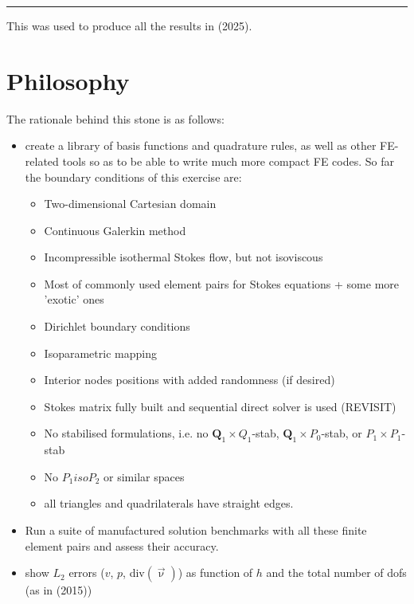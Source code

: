 \par\noindent\rule{\textwidth}{0.4pt}



This \stone was used to produce all the results in \textcite{thba25} (2025).

\section*{Philosophy}

The rationale behind this stone is as follows:
\begin{itemize}
\item create a library of basis functions and quadrature rules, as well as 
other FE-related tools so as to be able to write much more compact FE codes. 
So far the boundary conditions of this exercise are:
\begin{itemize}
\item Two-dimensional Cartesian domain
\item Continuous Galerkin method
\item Incompressible isothermal Stokes flow, but not isoviscous
\item Most of commonly used element pairs for Stokes equations + some more 'exotic' ones 
\item Dirichlet boundary conditions 
\item Isoparametric mapping 
\item Interior nodes positions with added randomness (if desired)
\item Stokes matrix fully built and sequential direct solver is used (REVISIT)
\item No stabilised formulations, i.e. no ${\bm Q}_1\times Q_1$-stab, 
      ${\bm Q}_1\times P_0$-stab, or $P_1\times P_1$-stab
\item No $P_1isoP_2$ or similar spaces
\item all triangles and quadrilaterals have straight edges.
\end{itemize}
\item Run a suite of manufactured solution benchmarks with all 
these finite element pairs and assess their accuracy.
\item show $L_2$ errors ($v$, $p$, div$(\vec\upnu)$) as function of $h$ and the 
total number of dofs (as in \textcite{cakp15} (2015))
\end{itemize}

